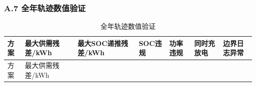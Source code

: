 \documentclass[zihao=-4,a4paper,UTF8,fontset=none]{ctexart}
\begin{document}
\endgroup

\par\pagebreak[2]\subsubsection*{A.7 全年轨迹数值验证}

\begingroup\renewcommand{\tablename}{附表}\renewcommand{\thetable}{A-7}

\begin{longtable}[]{@{}
  >{\centering\arraybackslash}p{}
  >{\centering\arraybackslash}p{}
  >{\centering\arraybackslash}p{}
  >{\centering\arraybackslash}p{}
  >{\centering\arraybackslash}p{}
  >{\centering\arraybackslash}p{}
  >{\centering\arraybackslash}p{}@{}}
\caption{全年轨迹数值验证}\label{tab:appendix-A-7}\tabularnewline
\toprule\noalign{}
\begin{minipage}[b]{\linewidth}\centering
方案
\end{minipage} & \begin{minipage}[b]{\linewidth}\centering
最大供需残差/kWh
\end{minipage} & \begin{minipage}[b]{\linewidth}\centering
最大SOC递推残差/kWh
\end{minipage} & \begin{minipage}[b]{\linewidth}\centering
SOC违规
\end{minipage} & \begin{minipage}[b]{\linewidth}\centering
功率违规
\end{minipage} & \begin{minipage}[b]{\linewidth}\centering
同时充放电
\end{minipage} & \begin{minipage}[b]{\linewidth}\centering
边界日志异常
\end{minipage} \\
\midrule\noalign{}
\endfirsthead
\toprule\noalign{}
\begin{minipage}[b]{\linewidth}\centering
方案
\end{minipage} & \begin{minipage}[b]{\linewidth}\centering
最大供需残差/kWh
\end{minipage} & \begin{minipage}[b]{\linewidth}\centering

\end{minipage}
\end{longtable}
\end{document}
